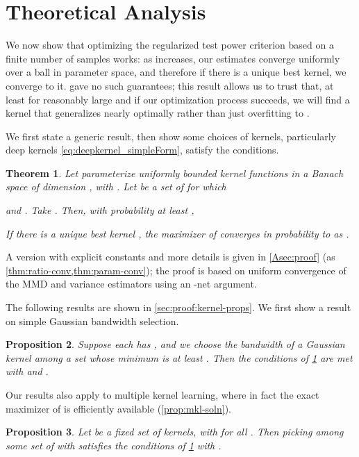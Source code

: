 \documentclass{article}
\newtheorem{theorem}{Theorem} \crefname{theorem}{Theorem}{Theorems}
\newtheorem{prop}[theorem]{Proposition}  \crefname{prop}{Proposition}{Propositions}
\begin{document}
\section{Theoretical Analysis}
We now show that optimizing the regularized test power criterion based on a finite number of samples works:
as  increases, our estimates converge uniformly over a ball in parameter space,
and therefore if there is a unique best kernel,
we converge to it.
\citet{sutherland:mmd-opt} gave no such guarantees;
this result allows us to trust that,
at least for reasonably large  and if our optimization process succeeds,
we will find a kernel that generalizes nearly optimally
rather than just overfitting to .

We first state a generic result,
then show some choices of kernels, particularly deep kernels \eqref{eq:deepkernel_simpleForm}, satisfy the conditions.
\begin{theorem} \label{thm:test-power-conv}
   Let  parameterize uniformly bounded kernel functions  in a Banach space of dimension ,
   with
   .
   Let  be a set of  for which
   
   and .
   Take .
   Then,
   with probability at least ,

    If there is a unique best kernel ,
    the maximizer of  converges in probability to  as .
\end{theorem}
A version with explicit constants and more details is given in \cref{Asec:proof} (as \cref{thm:ratio-conv,thm:param-conv});
the proof is based on
uniform convergence of the MMD and variance estimators
using an -net argument.

The following results are shown in \cref{sec:proof:kernel-props}.
We first show a result on simple Gaussian bandwidth selection.

\begin{prop} \label{thm:main-rbf-lip}
    Suppose each  has ,
    and we choose the bandwidth of a Gaussian kernel
    among a set whose minimum is at least .
    Then the conditions of \cref{thm:test-power-conv}
    are met with  and
    .
\end{prop}

Our results also apply to multiple kernel learning,
where in fact the exact maximizer of  is efficiently available (\cref{prop:mkl-soln}).
\begin{prop} \label{thm:main-mkl-lip}
    Let  be a fixed set of kernels,
    with  for all .
    Then
    picking 
    among some set of  with 
    satisfies the conditions of \cref{thm:test-power-conv}
    with .
\end{prop}
\end{document}
